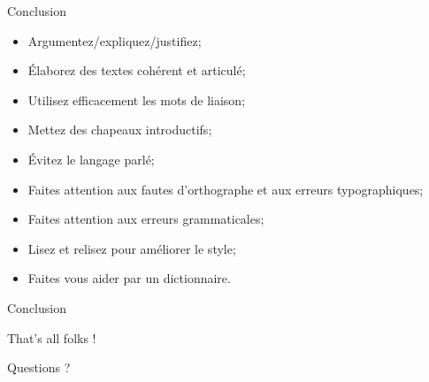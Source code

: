 \documentclass[french]{beamer}
\begin{document}
\begin{frame}{Conclusion}
\begin{itemize}
	\item Argumentez/expliquez/justifiez;
	\item Élaborez des textes cohérent et articulé;
	\item Utilisez efficacement les mots de liaison;
	\item Mettez des chapeaux introductifs;
	\item Évitez le langage parlé;
	\item Faites attention aux fautes d'orthographe et aux erreurs typographiques;
	\item Faites attention aux erreurs grammaticales;
	\item Lisez et relisez pour améliorer le style;
	\item Faites vous aider par un dictionnaire.
\end{itemize}

\end{frame}
\begin{frame}[label=conclu]{Conclusion}
\begin{center}
	\Huge{That's all folks !}
	
	\normalsize Questions ?
\end{center}
\end{frame}

\end{document}
